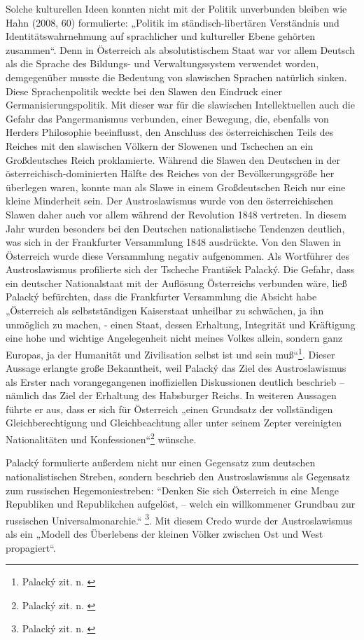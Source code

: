 \documentclass[12pt,headsepline,a4paper]{scrartcl}
\begin{document}
Solche kulturellen Ideen konnten nicht mit der Politik unverbunden bleiben wie Hahn (2008,
60) formulierte: „Politik im ständisch-libertären Verständnis und Identitätswahrnehmung auf
sprachlicher und kultureller Ebene gehörten zusammen“. Denn in Österreich als
absolutistischem Staat war vor allem Deutsch als die Sprache des Bildungs- und
Verwaltungssystem verwendet worden, demgegenüber musste die Bedeutung von slawischen
Sprachen natürlich sinken. Diese Sprachenpolitik weckte bei den Slawen den Eindruck einer
Germanisierungspolitik. Mit dieser war für die slawischen Intellektuellen auch die Gefahr das
Pangermanismus verbunden, einer Bewegung, die, ebenfalls von Herders Philosophie
beeinflusst, den Anschluss des österreichischen Teils des Reiches mit den slawischen Völkern
der Slowenen und Tschechen an ein Großdeutsches Reich proklamierte. Während die Slawen
den
Deutschen
in
der
österreichisch-dominierten
Hälfte
des
Reiches
von
der
Bevölkerungsgröße her überlegen waren, konnte man als Slawe in einem Großdeutschen
Reich nur eine kleine Minderheit sein. Der Austroslawismus wurde von den österreichischen
Slawen daher auch vor allem während der Revolution 1848 vertreten. In diesem Jahr wurden
besonders bei den Deutschen nationalistische Tendenzen deutlich, was sich in der Frankfurter
Versammlung 1848 ausdrückte. Von den Slawen in Österreich wurde diese Versammlung
negativ aufgenommen. Als Wortführer des Austroslawismus profilierte sich der Tscheche
František Palacký. Die Gefahr, dass ein deutscher Nationalstaat mit der Auflösung Österreichs
verbunden wäre, ließ Palacký befürchten, dass die Frankfurter Versammlung die Absicht habe
„Österreich als selbstständigen Kaiserstaat unheilbar zu schwächen, ja ihn unmöglich zu
machen, - einen Staat, dessen Erhaltung, Integrität und Kräftigung eine hohe und wichtige
Angelegenheit nicht meines Volkes allein, sondern ganz Europas, ja der Humanität und
Zivilisation selbst ist und sein muß“\footnote{Palacký zit. n. \autocite[19]{moritsch1996}}. Dieser Aussage
erlangte große Bekanntheit, weil Palacký das Ziel des Austroslawismus als Erster nach
vorangegangenen inoffiziellen Diskussionen deutlich beschrieb – nämlich das Ziel der
Erhaltung des Habsburger Reichs. In weiteren Aussagen führte er aus, dass er sich für Österreich „einen
Grundsatz der vollständigen Gleichberechtigung und Gleichbeachtung aller unter seinem
Zepter vereinigten Nationalitäten und Konfessionen“\footnote{Palacký zit. n. \autocite[19]{moritsch1996}} wünsche.

Palacký formulierte außerdem nicht nur einen Gegensatz zum deutschen nationalistischen
Streben,
sondern beschrieb
den Austroslawismus
als
Gegensatz
zum
russischen
Hegemoniestreben: “Denken Sie sich Österreich in eine Menge Republiken und Republikchen
aufgelöst, -- welch ein willkommener Grundbau zur russischen Universalmonarchie.“
\footnote{Palacký zit. n. \autocite[19]{moritsch1996}}. Mit diesem Credo wurde der Austroslawismus als ein „Modell des Überlebens der kleinen
Völker zwischen Ost und West propagiert“\autocite[IIX]{busek}.
\end{document}
